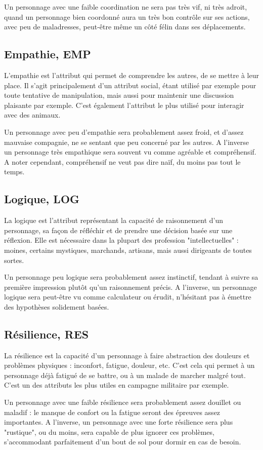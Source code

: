 \documentclass[10pt,a4paper,twocolumn]{book}
\begin{document}
Un personnage avec une faible coordination ne sera pas très vif, ni très adroit, quand un personnage bien coordonné aura un très bon contrôle sur ses actions, avec peu de maladresses, peut-être même un côté félin dans ses déplacements.
\subsection{Empathie, EMP}
L'empathie est l'attribut qui permet de comprendre les autres, de se mettre à leur place. Il s'agit principalement d'un attribut social, étant utilisé par exemple pour toute tentative de manipulation, mais aussi pour maintenir une discussion plaisante par exemple. C'est également l'attribut le plus utilisé pour interagir avec des animaux.

Un personnage avec peu d'empathie sera probablement assez froid, et d'assez mauvaise compagnie, ne se sentant que peu concerné par les autres. A l'inverse un personnage très empathique sera souvent vu comme agréable et compréhensif. A noter cependant, compréhensif ne veut pas dire naïf, du moins pas tout le temps.
\subsection{Logique, LOG}
La logique est l'attribut représentant la capacité de raisonnement d'un personnage, sa façon de réfléchir et de prendre une décision basée sur une réflexion. Elle est nécessaire dans la plupart des profession "intellectuelles" : moines, certains mystiques, marchands, artisans, mais aussi dirigeants de toutes sortes.

Un personnage peu logique sera probablement assez instinctif, tendant à suivre sa première impression plutôt qu'un raisonnement précis. A l'inverse, un personnage logique sera peut-être vu comme calculateur ou érudit, n'hésitant pas à émettre des hypothèses solidement basées.
\subsection{Résilience, RES}
La résilience est la capacité d'un personnage à faire abstraction des douleurs et problèmes physiques : inconfort, fatigue, douleur, etc. C'est cela qui permet à un personnage déjà fatigué de se battre, ou à un malade de marcher malgré tout. C'est un des attributs les plus utiles en campagne militaire par exemple.

Un personnage avec une faible résilience sera probablement assez douillet ou maladif : le manque de confort ou la fatigue seront des épreuves assez importantes. A l'inverse, un personnage avec une forte résilience sera plus "rustique", ou du moins, sera capable de plus ignorer ces problèmes, s’accommodant parfaitement d'un bout de sol pour dormir en cas de besoin.
\end{document}
